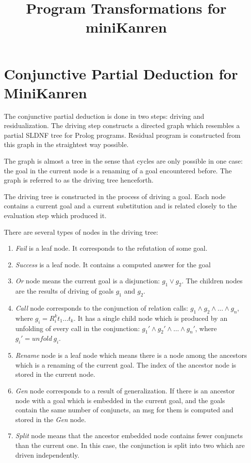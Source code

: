 \documentclass{llncs}
\begin{document}
\mainmatter

\title{Program Transformations for miniKanren}

\maketitle

\section{Conjunctive Partial Deduction for MiniKanren}

The conjunctive partial deduction is done in two steps: driving and residualization. 
The driving step constructs a directed graph which resembles a partial SLDNF tree for Prolog programs. Residual program is constructed from this graph in the straightest way possible.

The graph is almost a tree in the sense that cycles are only possible in one case: the goal in the current node is a renaming of a goal encountered before. The graph is referred to as the driving tree henceforth.

The driving tree is constructed in the process of driving a goal. Each node contains a current goal and a current substitution and is related closely to the evaluation step which produced it. 

There are several types of nodes in the driving tree: 
\begin{enumerate}
  \item \emph{Fail} is a leaf node. It corresponds to the refutation of some goal.
  \item \emph{Success} is a leaf node. It contains a computed answer for the goal
  \item \emph{Or} node means the current goal is a disjunction: $g_1 \vee   g_2$. The children nodes are the results of driving of goals $g_1$ and $g_2$. 
  \item \emph{Call} node corresponds to the conjunction of relation calls: $g_1 \wedge g_2 \wedge \dots \wedge g_n$, where $g_i = R^k_i t_1 \dots t_k$. It has a single child node which is produced by an unfolding of every call in the conjunction: $g_1' \wedge g_2' \wedge \dots \wedge g_n'$, where $g_i' = unfold \ g_i$.
  \item \emph{Rename} node is a leaf node which means there is a node among the ancestors which is a renaming of the current goal. The index of the ancestor node is stored in the current node. 
  \item \emph{Gen} node corresponds to a result of generalization. If there is an ancestor node with a goal which is embedded in the current goal, and the goals contain the same number of conjuncts, an msg for them is computed and stored in the \emph{Gen} node. 
  \item \emph{Split} node means that the ancestor embedded node contains fewer conjuncts than the current one. In this case, the conjunction is split into two which are driven independently. 
\end{enumerate}
\end{document}
